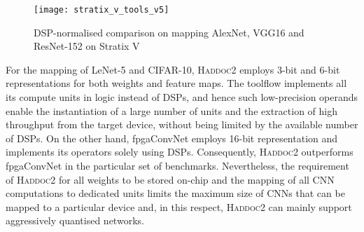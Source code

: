 \documentclass[format=acmsmall, review=false, screen=true]{acmart}
\begin{document}
\begin{figure*}[t]
    \centering
    \texttt{[image: stratix\_v\_tools\_v5]}
    \vspace{-0.4cm}
    \caption{DSP-normalised comparison on mapping AlexNet, VGG16 and ResNet-152 on Stratix V}
    \label{fig:stratix_v_tools}
    \vspace{-0.5cm}
\end{figure*}



{\color{black}For the mapping of LeNet-5 and CIFAR-10, \textsc{Haddoc2} employs 3-bit and 6-bit representations for both weights and feature maps. The toolflow implements all its compute units in logic instead of DSPs, and hence such low-precision operands enable the instantiation of a large number of units and the extraction of high throughput from the target device, without being limited by the available number of DSPs. On the other hand, fpgaConvNet employs 16-bit representation and implements its operators solely using DSPs. Consequently, \textsc{Haddoc2} outperforms fpgaConvNet in the particular set of benchmarks. Nevertheless, the requirement of \textsc{Haddoc2} for all weights to be stored on-chip and the mapping of all CNN computations to dedicated units limits the maximum size of CNNs that can be mapped to a particular device and, in this respect, \textsc{Haddoc2} can mainly support aggressively quantised networks.}

\end{document}
